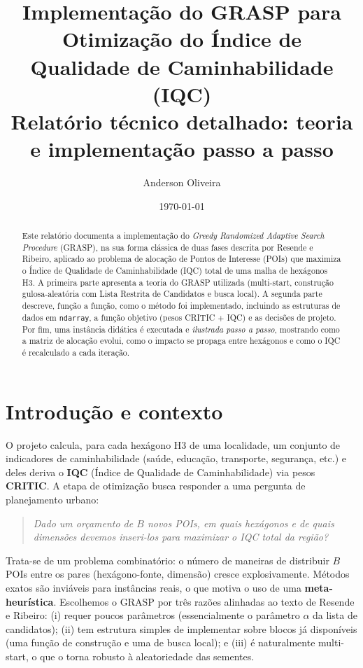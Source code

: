 \documentclass[11pt,a4paper]{article}
\title{\textbf{Implementação do GRASP para Otimização do Índice de\\
Qualidade de Caminhabilidade (IQC)}\\[4pt]
\large Relatório técnico detalhado: teoria e implementação passo a passo}
\author{Anderson Oliveira}
\date{\today}
\begin{document}
\maketitle

\begin{abstract}
\noindent
Este relatório documenta a implementação do \emph{Greedy Randomized Adaptive
Search Procedure} (GRASP), na sua forma clássica de duas fases descrita por
Resende e Ribeiro, aplicado ao problema de alocação de Pontos de Interesse
(POIs) que maximiza o Índice de Qualidade de Caminhabilidade (IQC) total de uma
malha de hexágonos H3. A primeira parte apresenta a teoria do GRASP utilizada
(multi-start, construção gulosa-aleatória com Lista Restrita de Candidatos e
busca local). A segunda parte descreve, função a função, como o método foi
implementado, incluindo as estruturas de dados em \texttt{ndarray}, a função
objetivo (pesos CRITIC + IQC) e as decisões de projeto. Por fim, uma instância
didática é executada e \emph{ilustrada passo a passo}, mostrando como a matriz de
alocação evolui, como o impacto se propaga entre hexágonos e como o IQC é
recalculado a cada iteração.
\end{abstract}

\tableofcontents
\newpage

\section{Introdução e contexto}

O projeto calcula, para cada hexágono H3 de uma localidade, um conjunto de
indicadores de caminhabilidade (saúde, educação, transporte, segurança, etc.) e
deles deriva o \textbf{IQC} (Índice de Qualidade de Caminhabilidade) via pesos
\textbf{CRITIC}. A etapa de otimização busca responder a uma pergunta de
planejamento urbano:

\begin{quote}
\itshape
Dado um orçamento de $B$ novos POIs, em quais hexágonos e de quais dimensões
devemos inseri-los para maximizar o IQC \emph{total} da região?
\end{quote}

Trata-se de um problema combinatório: o número de maneiras de distribuir $B$
POIs entre os pares (hexágono-fonte, dimensão) cresce explosivamente. Métodos
exatos são inviáveis para instâncias reais, o que motiva o uso de uma
\textbf{meta-heurística}. Escolhemos o GRASP por três razões alinhadas ao texto
de Resende e Ribeiro: (i) requer poucos parâmetros (essencialmente o parâmetro
$\alpha$ da lista de candidatos); (ii) tem estrutura simples de implementar sobre
blocos já disponíveis (uma função de construção e uma de busca local); e (iii)
é naturalmente multi-start, o que o torna robusto à aleatoriedade das sementes.
\end{document}
